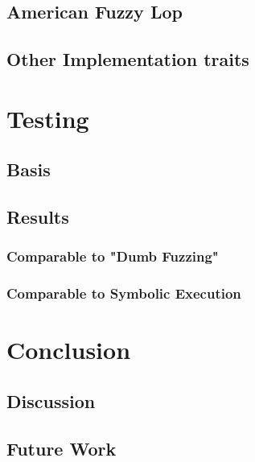 \documentclass[a4paper]{article}
\begin{document}
\subsection{American Fuzzy Lop}
\subsection{Other Implementation traits}

\section{Testing}
\subsection{Basis}
\subsection{Results}
\subsubsection*{Comparable to "Dumb Fuzzing"}
\subsubsection*{Comparable to Symbolic Execution}




\begin{comment}

Listinglabels
diffToFuzz
SymExExample
\end{comment}

\section{Conclusion}
\subsection{Discussion}
\subsection{Future Work}
\end{document}
